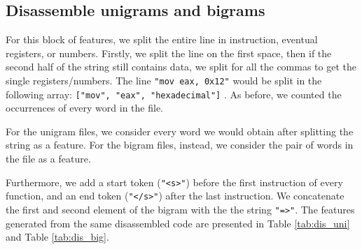 \subsection{Disassemble unigrams and bigrams}
For this block of features, we split the entire line in instruction, eventual registers, or numbers. Firstly, we split the line on the first space, then if the second half of the string still contains data, we split for all the commas to get the single registers/numbers. The line \texttt{"mov eax, 0x12"} would be split in the following array: \texttt{["mov", "eax", "hexadecimal"]} . As before, we counted the occurrences of every word in the file. 

For the unigram files, we consider every word we would obtain after splitting the string as a feature. For the bigram files, instead, we consider the pair of words in the file as a feature. 

Furthermore, we add a start token (\texttt{"<s>"}) before the first instruction of every function, and an end token (\texttt{"</s>"}) after the last instruction. We concatenate the first and second element of the bigram with the the string \texttt{"=>"}. The features generated from the same disassembled code are presented in Table \ref{tab:dis_uni} and Table \ref{tab:dis_big}.

